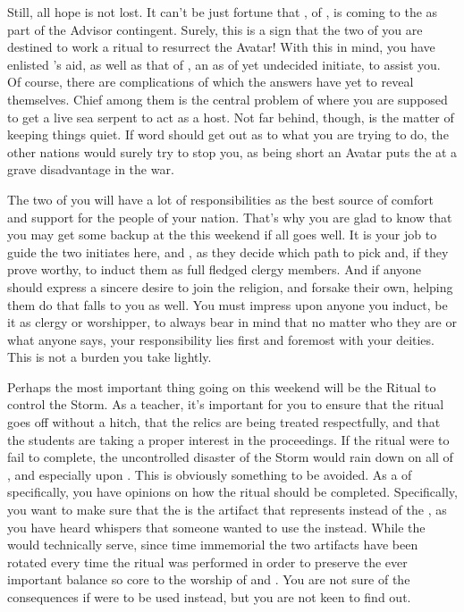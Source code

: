 \documentclass[char]{GL2020}
\begin{document}
Still, all hope is not lost. It can’t be just fortune that \cEbbPriest{}, \cEbbPriest{\cleric} of \cEbb{}, is coming to the \pSchool{} as part of the \pShip{} Advisor contingent. Surely, this is a sign that the two of you are destined to work a ritual to resurrect the Avatar! With this in mind, you have enlisted \cEbbPriest{}’s aid, as well as that of \cInitiate{}, an as of yet undecided initiate, to assist you. Of course, there are complications of which the answers have yet to reveal themselves. Chief among them is the central problem of where you are supposed to get a live sea serpent to act as a host. Not far behind, though, is the matter of keeping things quiet. If word should get out as to what you are trying to do, the other nations would surely try to stop you, as being short an Avatar puts the \pShippies{} at a grave disadvantage in the war. 

The two of you will have a lot of responsibilities as the best source of comfort and support for the people of your nation. That’s why you are glad to know that you may get some backup at the \pSc{} this weekend if all goes well. It is your job to guide the two initiates here, \cInitiate{} and \cWarlordDaughter{}, as they decide which path to pick and, if they prove worthy, to induct them as full fledged clergy members. And if anyone should express a sincere desire to join the \pShip{} religion, and forsake their own, helping them do that falls to you as well. You must impress upon anyone you induct, be it as clergy or worshipper, to always bear in mind that no matter who they are or what anyone says, your responsibility lies first and foremost with your deities. This is not a burden you take lightly.

Perhaps the most important thing going on this weekend will be the Ritual to control the Storm. As a teacher, it’s important for you to ensure that the ritual goes off without a hitch, that the relics are being treated respectfully, and that the students are taking a proper interest in the proceedings. If the ritual were to fail to complete, the uncontrolled disaster of the Storm would rain down on all of \pEarth{}, and especially upon \pSc{}. This is obviously something to be avoided. As a \cFlowPriest{\cleric} of \cFlow{} specifically, you have opinions on how the ritual should be completed. Specifically, you want to make sure that the \iNet{} is the artifact that represents \pShip{} instead of the \iChalice{}, as you have heard whispers that someone wanted to use the \iChalice{} instead. While the \iChalice{} would technically serve, since time immemorial the two artifacts have been rotated every time the ritual was performed in order to preserve the ever important balance so core to the worship of \cEbb{} and \cFlow{}. You are not sure of the consequences if \iChalice{} were to be used instead, but you are not keen to find out.
\end{document}
